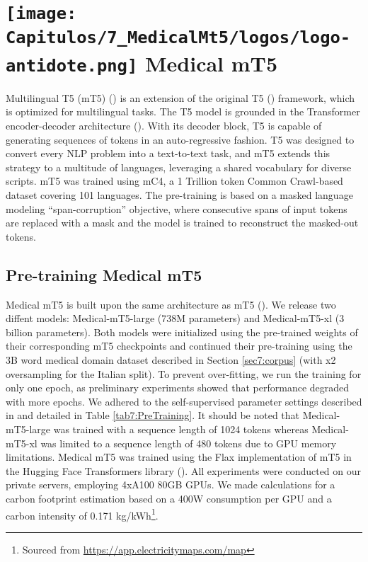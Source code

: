 \newcommand{\customsectiontitle}{
  \texttt{[image: Capitulos/7\_MedicalMt5/logos/logo-antidote.png]} Medical mT5
}
\section[Medical mT5]{\customsectiontitle}
\label{sec7:medicalmt5}

Multilingual T5 (mT5) (\cite{mt5}) is an extension of the original T5 (\cite{DBLP:journals/jmlr/RaffelSRLNMZLL20-T5}) framework, which is optimized for multilingual tasks. The T5 model is grounded in the Transformer encoder-decoder architecture (\cite{DBLP:conf/nips/VaswaniSPUJGKP17}). With its decoder block, T5 is capable of generating sequences of tokens in an auto-regressive fashion. T5 was designed to convert every NLP problem into a text-to-text task, and mT5 extends this strategy to a multitude of languages, leveraging a shared vocabulary for diverse scripts. mT5 was trained using mC4, a 1 Trillion token Common Crawl-based dataset covering 101 languages. The pre-training is based on a masked language modeling ``span-corruption'' objective, where consecutive spans of input tokens are replaced with a mask and the model is trained to reconstruct the masked-out tokens.

\subsection{Pre-training Medical mT5}



Medical mT5 is built upon the same architecture as mT5 (\cite{mt5}). We release two diffent models: Medical-mT5-large (738M parameters) and Medical-mT5-xl (3 billion parameters). Both models were initialized using the pre-trained weights of their corresponding mT5 checkpoints and continued their pre-training using the 3B word medical domain dataset described in Section \ref{sec7:corpus} (with x2 oversampling for the Italian split). To prevent over-fitting, we run the training for only one epoch, as preliminary experiments showed that performance degraded with more epochs. We adhered to the self-supervised parameter settings described in \citet{mt5} and detailed in Table \ref{tab7:PreTraining}. It should be noted that Medical-mT5-large was trained with a sequence length of 1024 tokens whereas Medical-mT5-xl was limited to a sequence length of 480 tokens due to GPU memory limitations. Medical mT5 was trained using the Flax implementation of mT5 in the Hugging Face Transformers library (\cite{wolf-etal-2020-huggingface-transformers}). All experiments were conducted on our private servers, employing 4xA100 80GB GPUs. We made calculations for a carbon footprint estimation based on a 400W consumption per GPU and a carbon intensity of 0.171 kg/kWh\footnote{Sourced from \url{https://app.electricitymaps.com/map}}. 


